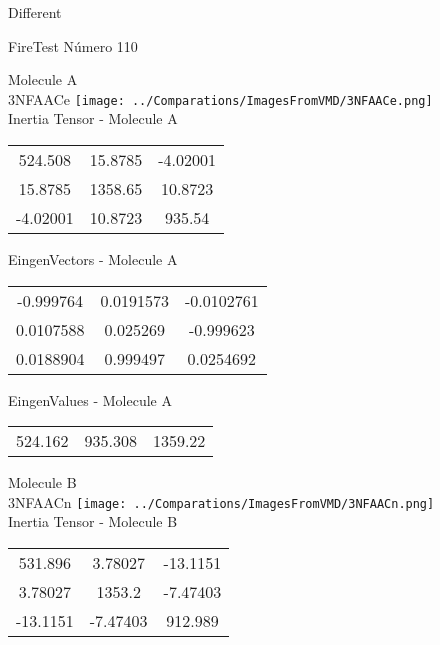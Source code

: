 \begin{center}
\vtab
\vtab
\textcolor{NavyBlue}{\Large Different}
\end{center}

 \newpage

\vtab[-2cm]
\begin{center}
{\large FireTest \tab Número 110}
\end{center}
\begin{multicols}{2}
\begin{center}

Molecule A \\ 
3NFAACe
\texttt{[image: ../Comparations/ImagesFromVMD/3NFAACe.png]}
\\
Inertia Tensor - Molecule A \\
\vtab

\begin{tabular}{|c c c|}
524.508	 & 	15.8785	 & 	-4.02001	 \\
15.8785	 & 	1358.65	 & 	10.8723	 \\
-4.02001	 & 	10.8723	 & 	935.54
\end{tabular}

\vtab
 EingenVectors - Molecule A     \\
\vtab
\begin{tabular}{|c c c|}
-0.999764	 & 	0.0191573	 & 	-0.0102761	 \\
0.0107588	 & 	0.025269	 & 	-0.999623	 \\
0.0188904	 & 	0.999497	 & 	0.0254692
\end{tabular}

\vtab
 EingenValues - Molecule A     \\
\vtab
\begin{tabular}{|c c c|}
524.162	 & 	935.308	 & 	1359.22	 \\
\end{tabular}
\columnbreak

Molecule B \\ 
3NFAACn
\texttt{[image: ../Comparations/ImagesFromVMD/3NFAACn.png]}
\\
Inertia Tensor - Molecule B \\
\vtab

\begin{tabular}{|c c c|}
531.896	 & 	3.78027	 & 	-13.1151	 \\
3.78027	 & 	1353.2	 & 	-7.47403	 \\
-13.1151	 & 	-7.47403	 & 	912.989
\end{tabular}


\end{center}
\end{multicols}
